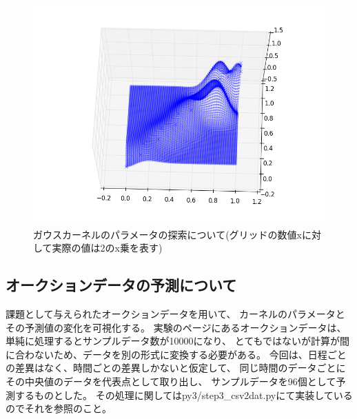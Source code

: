 \documentclass[]{jsarticle}
\begin{document}
\begin{figure}[htbp]
\begin{minipage}[b]{0.5\hsize}
 \end{minipage}
 \begin{minipage}[b]{0.5\hsize}
  \includegraphics[scale=0.4]{./images/gauss_coef.png}
 \end{minipage}
 \caption{ガウスカーネルのパラメータの探索について(グリッドの数値xに対して実際の値は2のx乗を表す)}
\end{figure}
\newpage

\subsection{ オークションデータの予測について }
課題として与えられたオークションデータを用いて、
カーネルのパラメータとその予測値の変化を可視化する。
実験のページにあるオークションデータは、単純に処理するとサンプルデータ数が10000になり、
とてもではないが計算が間に合わないため、データを別の形式に変換する必要がある。
今回は、日程ごとの差異はなく、時間ごとの差異しかないと仮定して、
同じ時間のデータごとにその中央値のデータを代表点として取り出し、
サンプルデータを96個として予測するものとした。
その処理に関してはpy3/step3\_csv2dat.pyにて実装しているのでそれを参照のこと。
\end{document}

